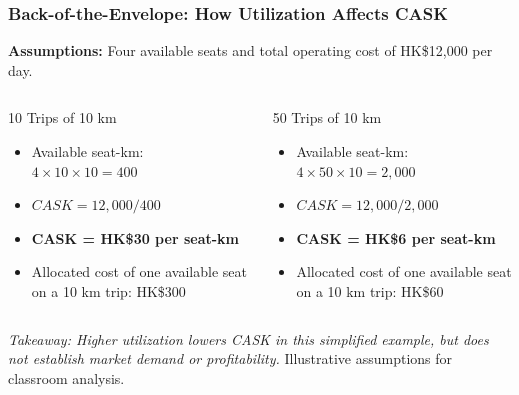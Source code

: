 \documentclass{beamer}
\begin{document}
\begin{frame}[t,shrink=10]
  \frametitle{Back-of-the-Envelope: How Utilization Affects CASK}
  \textbf{Assumptions:} Four available seats and total operating cost of HK\$12,000 per day.
  \begin{columns}[T]
    \begin{column}{0.48\textwidth}
      \begin{block}{10 Trips of 10 km}
      \begin{itemize}
        \item Available seat-km: $4\times10\times10=400$
        \item $CASK=12{,}000/400$
        \item \textbf{CASK = HK\$30 per seat-km}
        \item Allocated cost of one available seat on a 10 km trip: HK\$300
      \end{itemize}
      \end{block}
    \end{column}
    \begin{column}{0.48\textwidth}
      \begin{block}{50 Trips of 10 km}
      \begin{itemize}
        \item Available seat-km: $4\times50\times10=2{,}000$
        \item $CASK=12{,}000/2{,}000$
        \item \textbf{CASK = HK\$6 per seat-km}
        \item Allocated cost of one available seat on a 10 km trip: HK\$60
      \end{itemize}
      \end{block}
    \end{column}
  \end{columns}
  \textit{Takeaway: Higher utilization lowers CASK in this simplified example, but does not establish market demand or profitability.}
  \vfill
  {\tiny Illustrative assumptions for classroom analysis.}
\end{frame}
\end{document}
